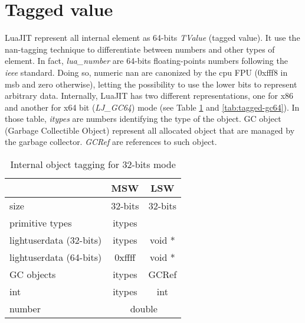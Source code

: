 
\section{Tagged value}
\label{Sec:tagged-value}

LuaJIT represent all internal element as 64-bits \emph{TValue} (tagged value).
It use the nan-tagging technique to differentiate between numbers and other
types of element. In fact, \emph{lua\_number} are 64-bits floating-points numbers
following the \emph{ieee} standard. Doing so, numeric nan are canonized by the
cpu FPU (0xfff8 in msb and zero otherwise), letting the possibility to use the
lower bits to represent arbitrary data. Internally, LuaJIT has two different
representations, one for x86 and another for x64 bit (\emph{LJ\_GC64}) mode
(see Table \ref{tab:tagged-gc32} and \ref{tab:tagged-gc64}). In those table,
\emph{itypes} are numbers identifying the type of the object.
GC object (Garbage Collectible Object) represent all allocated object
that are managed by the garbage collector. \emph{GCRef} are references to such
object.

\begin{table}[H]
\centering
\caption{Internal object tagging for 32-bits mode}
\label{tab:tagged-gc32}
\begin{tabular}{l|c|c|c|}
\cline{2-4}
                                              & \multicolumn{2}{c|}{MSW}         & LSW         \\ \hline
\multicolumn{1}{|l|}{size}                    & \multicolumn{2}{c|}{32-bits}     & 32-bits     \\ \hline
\multicolumn{1}{|l|}{primitive types}         & \multicolumn{2}{c|}{itypes}      &             \\
\multicolumn{1}{|l|}{lightuserdata (32-bits)} & \multicolumn{2}{c|}{itypes}      & void *      \\
\multicolumn{1}{|l|}{lightuserdata (64-bits)} & 0xffff           & \multicolumn{2}{c|}{void *} \\
\multicolumn{1}{|l|}{GC objects}              & \multicolumn{2}{c|}{itypes}      & GCRef       \\
\multicolumn{1}{|l|}{int}                     & \multicolumn{2}{c|}{itypes}      & int         \\
\multicolumn{1}{|l|}{number}                  & \multicolumn{3}{c|}{double}                    \\ \hline
\end{tabular}
\end{table}

